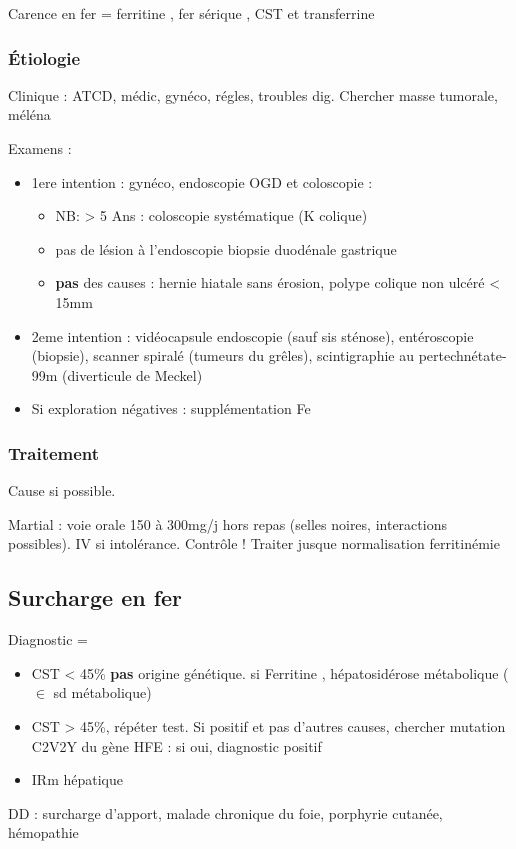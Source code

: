 \documentclass[11pt]{article}
\begin{document}
\begin{tcolorbox}
Carence en fer = ferritine \dec, fer sérique \dec, CST \dec et transferrine \inc
\end{tcolorbox}

\subsubsection{Étiologie}
\label{sec:org601cad3}
Clinique : ATCD, médic, gynéco, régles, troubles dig. Chercher masse tumorale,
méléna

Examens :
\begin{itemize}
\item 1ere intention : gynéco, endoscopie \gls{OGD} et coloscopie :
\begin{itemize}
\item NB: > 5 Ans : coloscopie systématique (K colique) \danger
\item pas de lésion à l'endoscopie \thus biopsie duodénale \textpm{} gastrique
\item \textbf{\textbf{pas}} des causes : hernie hiatale sans érosion, polype colique non ulcéré
< 15mm
\end{itemize}
\item 2eme intention : vidéocapsule endoscopie (sauf sis sténose), entéroscopie (biopsie),
scanner spiralé (tumeurs du grêles), scintigraphie au pertechnétate-99m
(diverticule de Meckel)
\item Si exploration négatives : supplémentation Fe
\end{itemize}

\subsubsection{Traitement}
\label{sec:org08b1fe2}
Cause si possible.

Martial : voie orale 150 à 300mg/j hors repas (selles noires, interactions
possibles). IV si intolérance. Contrôle ! Traiter jusque normalisation ferritinémie




\subsection{Surcharge en fer}
\label{sec:orga7f05c3}
Diagnostic = 
\begin{itemize}
\item CST < 45\% \thus \textbf{pas} origine génétique. si Ferritine \inc, hépatosidérose
métabolique (\(\in\) sd métabolique)
\item CST > 45\%, répéter test. Si positif et pas d'autres causes, chercher mutation C2V2Y du gène HFE : si
oui, diagnostic positif
\item \textpm{} IRm hépatique
\end{itemize}
DD : surcharge d'apport, malade chronique du foie, porphyrie cutanée, hémopathie
\end{document}
